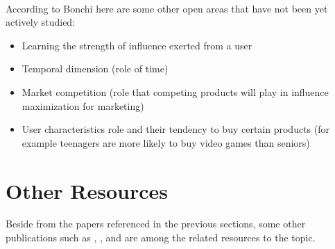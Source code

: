 \documentclass[english]{tktltiki}
\begin{document}
\\
According to Bonchi \cite{Bon11} here are some other open areas that have not been yet actively studied:
\begin{itemize}
\item Learning the strength of influence exerted from a user
\item Temporal dimension (role of time)
\item Market competition (role that competing products will play in influence maximization for marketing)
\item User characteristics role and their tendency to buy certain products (for example teenagers are more likely to buy video games than seniors)
\end{itemize}

\section{Other Resources}
Beside from the papers referenced in the previous sections, some other publications such as \cite{domingo02}, \cite{goyal10}, and \cite{cheng13} are among the related resources to the topic. 
\pagebreak



\lastpage

\pagestyle{empty}
\end{document}
